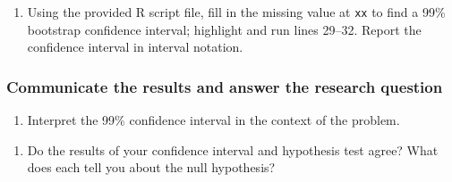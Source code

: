 \documentclass[
]{report}
\newenvironment{Shaded}{\begin{snugshade}}{\end{snugshade}}
\newcommand{\AttributeTok}[1]{\textcolor[rgb]{0.13,0.29,0.53}{#1}}
\newcommand{\CommentTok}[1]{\textcolor[rgb]{0.56,0.35,0.01}{\textit{#1}}}
\newcommand{\DecValTok}[1]{\textcolor[rgb]{0.00,0.00,0.81}{#1}}
\newcommand{\FunctionTok}[1]{\textcolor[rgb]{0.13,0.29,0.53}{\textbf{#1}}}
\newcommand{\NormalTok}[1]{#1}
\newcommand{\SpecialCharTok}[1]{\textcolor[rgb]{0.81,0.36,0.00}{\textbf{#1}}}
\providecommand{\tightlist}{%
  \setlength{\itemsep}{0pt}\setlength{\parskip}{0pt}}
\begin{document}
\vspace{0.8in}

\begin{enumerate}
\def\labelenumi{\arabic{enumi}.}
\setcounter{enumi}{16}
\tightlist
\item
  Using the provided R script file, fill in the missing value at \texttt{xx} to find a 99\% bootstrap confidence interval; highlight and run lines 29--32. Report the confidence interval in interval notation.
\end{enumerate}

\begin{Shaded}
\end{Shaded}

\vspace{.5in}

\hypertarget{communicate-the-results-and-answer-the-research-question-1}{%
\subsubsection*{Communicate the results and answer the research question}\label{communicate-the-results-and-answer-the-research-question-1}}

\begin{enumerate}
\def\labelenumi{\arabic{enumi}.}
\setcounter{enumi}{17}
\tightlist
\item
  Interpret the 99\% confidence interval in the context of the problem.
\end{enumerate}

\vspace{0.7in}

\begin{enumerate}
\def\labelenumi{\arabic{enumi}.}
\setcounter{enumi}{18}
\tightlist
\item
  Do the results of your confidence interval and hypothesis test agree? What does each tell you about the null hypothesis?
\end{enumerate}
\end{document}
